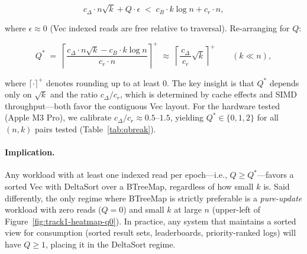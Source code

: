 \begin{equation}
  c_\Delta \cdot n\sqrt{k} + Q \cdot \epsilon
    \;<\;
  c_B \cdot k\log n + c_r \cdot n ,
\label{eq:qbreak}
\end{equation}

where $\epsilon \approx 0$ (Vec indexed reads are free relative to traversal).
Re-arranging for $Q$:

\begin{equation}
  Q^* \;=\; \left\lceil \frac{c_\Delta \cdot n\sqrt{k} - c_B \cdot k\log n}{c_r \cdot n}
             \right\rceil^+
        \;\approx\; \left\lceil \frac{c_\Delta}{\;c_r\;} \sqrt{k} \right\rceil^+
  \qquad (k \ll n),
\label{eq:qbreak-approx}
\end{equation}

where $\lceil \cdot \rceil^+$ denotes rounding up to at least $0$.
The key insight is that $Q^*$ depends only on $\sqrt{k}$ and the ratio $c_\Delta / c_r$,
which is determined by cache effects and SIMD throughput---both favor the contiguous Vec layout.
For the hardware tested (Apple M3 Pro), we calibrate $c_\Delta / c_r \approx 0.5$--$1.5$,
yielding $Q^* \in \{0,1,2\}$ for all $(n,k)$ pairs tested
(Table~\ref{tab:qbreak}).

\paragraph{Implication.}
Any workload with at least one indexed read per epoch---i.e., $Q \geq Q^*$---favors
a sorted Vec with DeltaSort over a BTreeMap, regardless of how small $k$ is.
Said differently, the only regime where BTreeMap is strictly preferable is a
\emph{pure-update} workload with zero reads ($Q = 0$) and small $k$ at large $n$
(upper-left of Figure~\ref{fig:track1-heatmap-q0}).  In practice, any system that
maintains a sorted view for consumption (sorted result sets, leaderboards, priority-ranked logs)
will have $Q \geq 1$, placing it in the DeltaSort regime.

